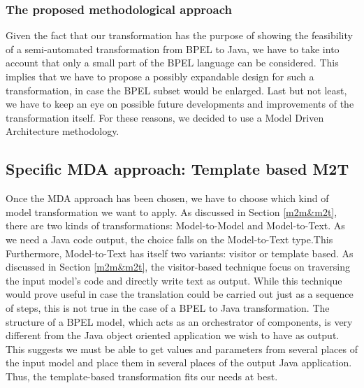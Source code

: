 \subsubsection{The proposed methodological approach}
Given the fact that our transformation has the purpose of showing the feasibility of a semi-automated transformation from BPEL to Java, we have to take into account that only a small part of the BPEL language can be considered. This implies that we have to propose a possibly expandable design for such a transformation, in case the BPEL subset would be enlarged. Last but not least, we have to keep an eye on possible future developments and improvements of the transformation itself. For these reasons, we decided to use a Model Driven Architecture methodology.

\subsection{Specific MDA approach: Template based M2T}
\label{sec:M2TApproach}
Once the MDA approach has been chosen, we have to choose which kind of model transformation we want to apply. As discussed in Section \ref{m2m&m2t}, there are two kinds of transformations: Model-to-Model and Model-to-Text. As we need a Java code output, the choice falls on the Model-to-Text type.This
Furthermore, Model-to-Text has itself two variants: visitor or template based. As discussed in Section \ref{m2m&m2t}, the visitor-based technique focus on traversing the input model's code and directly write text as output. While this technique would prove useful in case the translation could be carried out just as a sequence of steps, this is not true in the case of a BPEL to Java transformation. 
The structure of a BPEL model, which acts as an orchestrator of components, is very different from the Java object oriented application we wish to have as output.
This suggests we must be able to get values and parameters from several places of the input model and place them in several places of the output Java application. Thus, the template-based transformation fits our needs at best.

